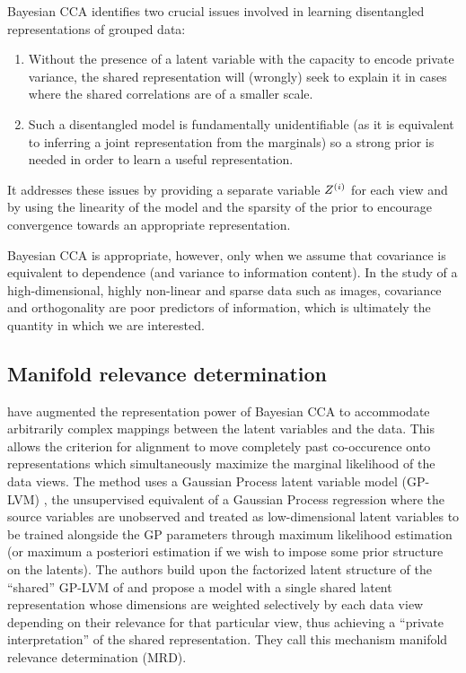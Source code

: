 \documentclass[../thesis.tex]{subfiles}
\begin{document}
Bayesian CCA identifies two crucial issues involved in learning disentangled representations of grouped data: 
\begin{enumerate}
    \item Without the presence of a latent variable with the capacity to encode private variance, the shared representation will (wrongly) seek to explain it in cases where the shared correlations are of a smaller scale.
    \item Such a disentangled model is fundamentally unidentifiable (as it is equivalent to inferring a joint representation from the marginals) so a strong prior is needed in order to learn a useful representation.
\end{enumerate}
It addresses these issues by providing a separate variable $\myrv{z}^{(i)}$ for each view and by using the linearity of the model and the sparsity of the prior to encourage convergence towards an appropriate representation.

Bayesian CCA is appropriate, however, only when we assume that covariance is equivalent to dependence (and variance to information content). In the study of a high-dimensional, highly non-linear and sparse data such as images, covariance and orthogonality are poor predictors of information, which is ultimately the quantity in which we are interested.

\subsection{Manifold relevance determination} 

\citet{damianou2016multi} have augmented the representation power of Bayesian CCA to accommodate arbitrarily complex mappings between the latent variables and the data. This allows the criterion for alignment to move completely past co-occurence onto representations which simultaneously maximize the marginal likelihood of the data views. The method uses a Gaussian Process latent variable model (GP-LVM) \cite{lawrence2004gaussian}, the unsupervised equivalent of a Gaussian Process regression where the source variables are unobserved and treated as low-dimensional latent variables to be trained alongside the GP parameters through maximum likelihood estimation (or maximum a posteriori estimation if we wish to impose some prior structure on the latents). The authors build upon the factorized latent structure of the ``shared'' GP-LVM of \citet{ek2008gp} and propose a model with a single shared latent representation whose dimensions are weighted selectively by each data view depending on their relevance for that particular view, thus achieving a ``private interpretation'' of the shared representation. They call this mechanism manifold relevance determination (MRD).
\end{document}
